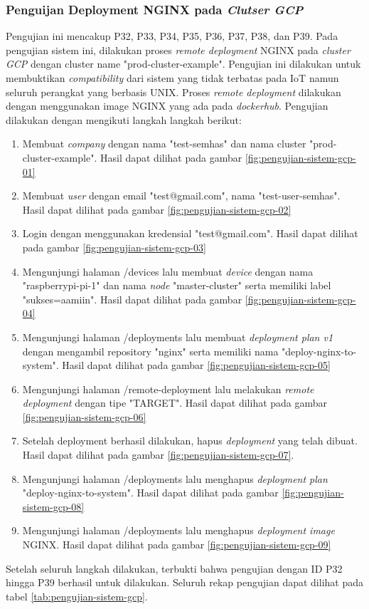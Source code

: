 \subsubsection{Penguijan Deployment NGINX pada \textit{Clutser GCP}}

Pengujian ini mencakup P32, P33, P34, P35, P36, P37, P38, dan P39. Pada pengujian sistem ini, dilakukan proses \textit{remote deployment} NGINX pada \textit{cluster GCP} dengan cluster name "prod-cluster-example". Pengujian ini dilakukan untuk membuktikan \textit{compatibility} dari sistem yang tidak terbatas pada IoT namun seluruh perangkat yang berbasis UNIX. Proses \textit{remote deployment} dilakukan dengan menggunakan image NGINX yang ada pada \textit{dockerhub}. Pengujian dilakukan dengan mengikuti langkah langkah berikut:

\begin{enumerate}
  \item Membuat \textit{company} dengan nama "test-semhas" dan nama cluster "prod-cluster-example". Hasil dapat dilihat pada gambar \ref{fig:pengujian-sistem-gcp-01}
  \item Membuat \textit{user} dengan email "test@gmail.com", nama "test-user-semhas". Hasil dapat dilihat pada gambar \ref{fig:pengujian-sistem-gcp-02}
  \item Login dengan menggunakan kredensial "test@gmail.com". Hasil dapat dilihat pada gambar \ref{fig:pengujian-sistem-gcp-03}
  \item Mengunjungi halaman /devices lalu membuat \textit{device} dengan nama "raspberrypi-pi-1" dan nama \textit{node} "master-cluster" serta memiliki label "sukses=aamiin". Hasil dapat dilihat pada gambar \ref{fig:pengujian-sistem-gcp-04}
  \item Mengunjungi halaman /deployments lalu membuat \textit{deployment plan v1} dengan mengambil repository "nginx" serta memiliki nama "deploy-nginx-to-system". Hasil dapat dilihat pada gambar \ref{fig:pengujian-sistem-gcp-05}
  \item Mengunjungi halaman /remote-deployment lalu melakukan \textit{remote deployment} dengan tipe "TARGET". Hasil dapat dilihat pada gambar \ref{fig:pengujian-sistem-gcp-06}
  \item Setelah deployment berhasil dilakukan, hapus \textit{deployment} yang telah dibuat. Hasil dapat dilihat pada gambar \ref{fig:pengujian-sistem-gcp-07}.
  \item Mengunjungi halaman /deployments lalu menghapus \textit{deployment plan} "deploy-nginx-to-system". Hasil dapat dilihat pada gambar \ref{fig:pengujian-sistem-gcp-08}
  \item Mengunjungi halaman /deployments lalu menghapus \textit{deployment image} NGINX. Hasil dapat dilihat pada gambar \ref{fig:pengujian-sistem-gcp-09}
\end{enumerate}

Setelah seluruh langkah dilakukan, terbukti bahwa pengujian dengan ID P32 hingga P39 berhasil untuk dilakukan. Seluruh rekap pengujian dapat dilihat pada tabel \ref{tab:pengujian-sistem-gcp}.